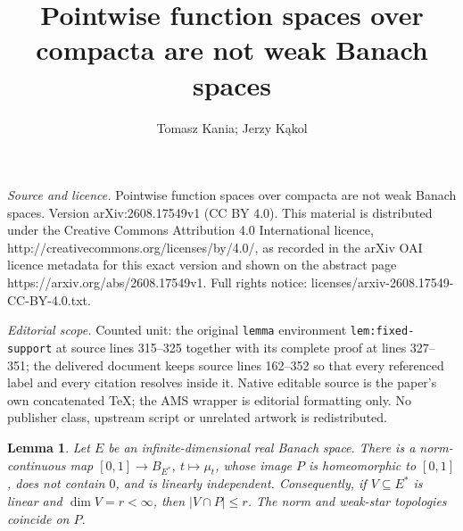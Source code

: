 \documentclass[10pt,a4paper]{amsart}
\newtheorem{lemma}[theorem]{Lemma}
\newcommand{\abs}[1]{\lvert #1\rvert}
\begin{document}
\title[Pointwise function spaces over compacta are not weak Banach ]{Pointwise function spaces over compacta are not weak Banach spaces}
\author{Tomasz Kania; Jerzy Kąkol}
\date{}
\maketitle
\noindent\emph{Source and licence.} Pointwise function spaces over compacta are not weak Banach spaces. Version arXiv:2608.17549v1 (CC BY 4.0). This material is distributed under the Creative Commons Attribution 4.0 International licence, http://creativecommons.org/licenses/by/4.0/, as recorded in the arXiv OAI licence metadata for this exact version and shown on the abstract page https://arxiv.org/abs/2608.17549v1. Full rights notice: licenses/arxiv-2608.17549-CC-BY-4.0.txt.\par\smallskip
\noindent\textit{Editorial scope.} Counted unit: the original \texttt{lemma} environment \texttt{lem:fixed-support} at source lines 315--325 together with its complete proof at lines 327--351; the delivered document keeps source lines 162--352 so that every referenced label and every citation resolves inside it. Native editable source is the paper's own concatenated TeX; the AMS wrapper is editorial formatting only. No publisher class, upstream script or unrelated artwork is redistributed.
\begin{lemma}\label{lem:arc}
Let $E$ be an infinite-dimensional real Banach space.  There is a
norm-continuous map $[0,1]\to B_{E^*}$, $t\mapsto\mu_t$,
whose image $P$ is homeomorphic to $[0,1]$, does not contain $0$, and is
linearly independent.  Consequently, if $V\subseteq E^*$ is
linear and $\dim V=r<\infty$, then $\abs{V\cap P}\leqslant r$.  The norm
and weak-star topologies coincide on $P$.
\end{lemma}
\end{document}
